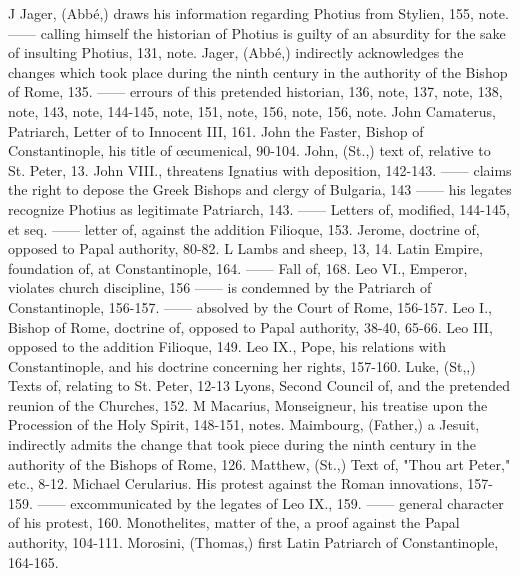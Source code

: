 J Jager, (Abbé,) draws his information regarding Photius from Stylien, 155, note. —— calling himself the historian of Photius is guilty of an absurdity for the sake of insulting Photius, 131, note. Jager, (Abbé,) indirectly acknowledges the changes which took place during the ninth century in the authority of the Bishop of Rome, 135. —— errours of this pretended historian, 136, note, 137, note, 138, note, 143, note, 144-145, note, 151, note, 156, note, 156, note. John Camaterus, Patriarch, Letter of to Innocent III, 161. John the Faster, Bishop of Constantinople, his title of œcumenical, 90-104. John, (St.,) text of, relative to St. Peter, 13. John VIII., threatens Ignatius with deposition, 142-143. —— claims the right to depose the Greek Bishops and clergy of Bulgaria, 143 —— his legates recognize Photius as legitimate Patriarch, 143. —— Letters of, modified, 144-145, et seq. —— letter of, against the addition Filioque, 153. Jerome, doctrine of, opposed to Papal authority, 80-82. L Lambs and sheep, 13, 14. Latin Empire, foundation of, at Constantinople, 164. —— Fall of, 168. Leo VI., Emperor, violates church discipline, 156 —— is condemned by the Patriarch of Constantinople, 156-157. —— absolved by the Court of Rome, 156-157. Leo I., Bishop of Rome, doctrine of, opposed to Papal authority, 38-40, 65-66. Leo III, opposed to the addition Filioque, 149. Leo IX., Pope, his relations with Constantinople, and his doctrine concerning her rights, 157-160. Luke, (St,,) Texts of, relating to St. Peter, 12-13 Lyons, Second Council of, and the pretended reunion of the Churches, 152. M Macarius, Monseigneur, his treatise upon the Procession of the Holy Spirit, 148-151, notes. Maimbourg, (Father,) a Jesuit, indirectly admits the change that took piece during the ninth century in the authority of the Bishops of Rome, 126. Matthew, (St.,) Text of, "Thou art Peter," etc., 8-12. Michael Cerularius. His protest against the Roman innovations, 157-159. —— excommunicated by the legates of Leo IX., 159. —— general character of his protest, 160. Monothelites, matter of the, a proof against the Papal authority, 104-111. Morosini, (Thomas,) first Latin Patriarch of Constantinople, 164-165.

